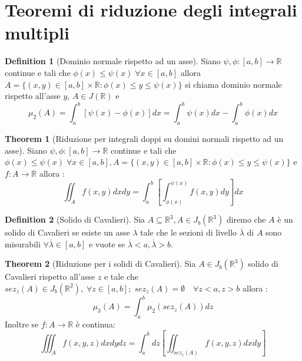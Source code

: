 \documentclass[leqno]{article}
\theoremstyle{definition}
\newtheorem{definition}{Definition}[section]
\numberwithin{equation}{section}
\newtheorem{theorem}{Theorem}[section]
\theoremstyle{remark}
\begin{document}
	\section{Teoremi di riduzione degli integrali multipli}
	
	\begin{definition}[Dominio normale rispetto ad un asse]
		Siano $\psi, \phi:[a,b]\to \mathbb{R} $ continue e tali che $\phi(x)\le \psi(x) \; \forall x\in[a,b]$ allora $A=\{(x,y)\in[a,b]\times\mathbb{R} : \phi(x)\le y \le \psi(x)\}$ si chiama dominio normale rispetto all'asse $y$, $A\in J(\mathbb{R})$ e
		\begin{equation}
			\mu_2(A)=\int_a^b[\psi(x)-\phi(x)]dx=\int_a^b\psi(x)dx-\int_a^b\phi(x)dx
		\end{equation}
	\end{definition}
	\begin{theorem}[Riduzione per integrali doppi su domini normali rispetto ad un asse]
		Siano $\psi, \phi:[a,b]\to \mathbb{R} $ continue e tali che $\phi(x)\le \psi(x) \; \forall x\in[a,b], A=\{(x,y)\in[a,b]\times\mathbb{R} : \phi(x)\le y \le \psi(x)\}$ e $f:A\to \mathbb{R}$ allora :
		\begin{equation}
			\iint_Af(x,y)dxdy=\int_a^b\left[\int_{\phi(x)}^{\psi(x)}f(x,y)dy\right]dx
		\end{equation}
	\end{theorem}
	\begin{definition}[Solido di Cavalieri] 
		Sia $A\subseteq \mathbb{R}^3, A\in J_b (\mathbb{R}^3)$ diremo che $A$ è un solido di Cavalieri se esiste un asse $\lambda $ tale che le sezioni di livello $\overline{\lambda}$ di $A$ sono misurabili $\forall \overline{\lambda} \in [a,b]$ e vuote se $\overline{\lambda} < a, \overline{\lambda} > b$.
	\end{definition}
	\begin{theorem}[Riduzione per i solidi di Cavalieri]
		Sia $A\in J_b(\mathbb{R}^3)$ solido di Cavalieri rispetto all'asse $z$ e tale che $sez_z(A)\in J_b(\mathbb{R}^2),\; \forall z\in [a,b]; \; sez_z(A)=\emptyset \quad\forall z< a, z> b$ allora :
		\begin{equation}
			\mu_3(A)=\int_a^b\mu_2(sez_z(A))dz
		\end{equation}
		Inoltre se $f:A\to \mathbb{R}$ è continua: 
		\begin{equation}
			\iiint_Af(x,y,z)dxdydz=\int_a^bdz\left[\iint_{sez_z(A)}f(x,y,z)dxdy\right]
		\end{equation}
	\end{theorem}
\end{document}
